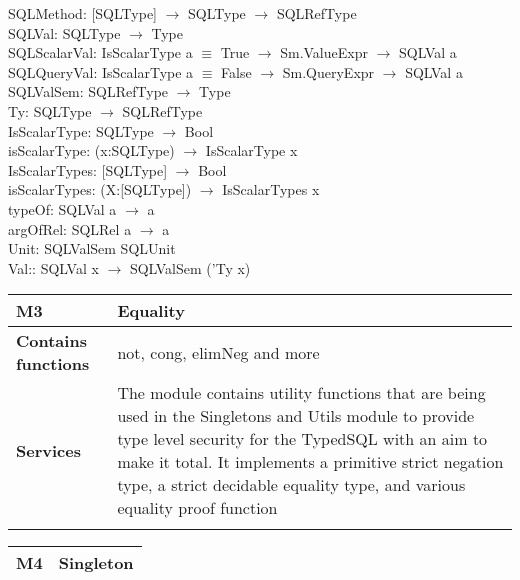 \documentclass[12pt, svgnames]{article}
\begin{document}
{{ SQLMethod: [SQLType] $\rightarrow$ SQLType $\rightarrow$ SQLRefType \\
 SQLVal: SQLType $\rightarrow$ Type \\
 
 SQLScalarVal: IsScalarType a $\equiv$ True $\rightarrow$ Sm.ValueExpr 
 $\rightarrow$ SQLVal a \\
 SQLQueryVal: IsScalarType a $\equiv$ False $\rightarrow$ Sm.QueryExpr 
 $\rightarrow$ SQLVal a \\
 
 SQLValSem: SQLRefType $\rightarrow$ Type\\

 
 Ty: SQLType $\rightarrow$ SQLRefType \\

 IsScalarType: SQLType $\rightarrow$ Bool \\
 isScalarType: (x:SQLType) $\rightarrow$ IsScalarType x \\
 IsScalarTypes: [SQLType] $\rightarrow$ Bool \\
 isScalarTypes: (X:[SQLType]) $\rightarrow$ IsScalarTypes x \\
 
 typeOf: SQLVal a $\rightarrow$ a \\
 argOfRel: SQLRel a $\rightarrow$ a\\
 
 Unit: SQLValSem SQLUnit\\
 Val:: SQLVal x $\rightarrow$ SQLValSem ('Ty x)
 
 

{\setlength{\tabcolsep}{6pt} 
    \begin{tabularx}{\textwidth}{>{\bfseries}m{4cm}X}
        M3 & Equality \\ 
        \midrule
        
        Contains functions  &  not, cong, elimNeg and more
        \\	Services &  The module contains utility functions that are being used in the Singletons and Utils module to provide type 		level security for the TypedSQL with an aim to make it total. It implements a primitive strict negation type, a strict decidable equality type,  and various equality proof function
        \\       
        \vspace{12pt}
    \end{tabularx}
    \vspace{3em}
{\setlength{\tabcolsep}{6pt} 
    \begin{tabularx}{\textwidth}{>{\bfseries}m{4cm}X}
        M4 & Singleton \\ 
        \midrule
        

\end{tabularx}}}}}
\end{document}
